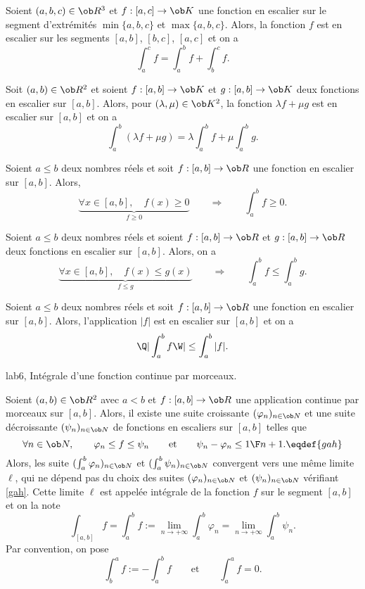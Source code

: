 \Propriete [Title=Relation de Chasles]
Soient $(a,b,c)\in\ob R^3$ et $f:[a,c]\to\ob K$ une fonction en escalier sur le segment d'extrémités $\min\{a,b,c\}$ et $\max\{a,b,c\}$. Alors, la fonction $f$ est en escalier sur les segments $[a,b]$, $[b,c]$, $[a,c]$ et on a 
$$
\int_a^cf=\int_a^bf+\int_b^cf. 
$$

\Propriete [Title=Linéarité de l'intégrale]
Soit $(a,b)\in\ob R^2$ et soient $f:[a,b]\to\ob K$ et $g:[a,b]\to\ob K$ deux fonctions en escalier sur $[a,b]$. Alors, pour $(\lambda,\mu)\in\ob K^2$, la fonction $\lambda f+\mu g$ est en escalier sur $[a,b]$ et on a 
$$
\int_a^b(\lambda f+\mu g)=\lambda \int_a^bf+\mu \int_a^bg. 
$$

\Propriete[Title=positivité de l'intégrale] Soient $a\le b$ deux nombres réels et soit $f:[a,b]\to\ob R$ une fonction en escalier sur $[a,b]$. Alors, 
$$
\underbrace{
\forall x\in[a,b],\quad f(x)\ge0}_{f\ge0}\qquad\Longrightarrow\qquad \int_a^bf\ge0.
$$ 
\bigskip


\Propriete [Title=Croissance de l'intégrale]
Soient $a\le b$ deux nombres réels et soient $f:[a,b]\to\ob R$ et $g:[a,b]\to\ob R$ deux fonctions en escalier sur $[a,b]$. Alors, on a 
$$
\underbrace{
\forall x\in[a,b],\quad f(x)\le g(x)}_{f\le g}\qquad\Longrightarrow\qquad \int_a^bf\le \int_a^bg.
$$ 

\Propriete[Title=module]
Soient $a\le b$ deux nombres réels et soit $f:[a,b]\to\ob R$ une fonction 
en escalier sur $[a,b]$. Alors, l'application $|f|$ est en escalier sur $[a,b]$ et on a 
$$
\Q|\int_a^bf\W|\le \int_a^b|f|.
$$ 
\bigskip

\Subsection lab6, Intégrale d'une fonction continue par morceaux. 

\Definition []  Soient $(a,b)\in\ob R^2$ avec $a< b$ et $f:[a,b]\to\ob R$ une application continue par morceaux sur $[a,b]$. 
Alors, il existe une suite croissante $(\varphi_n)_{n\in\ob N}$ et une suite décroissante $(\psi_n)_{n\in\ob N}$ de fonctions en escaliers sur $[a,b]$ telles que 
$$
\forall n\in\ob N, \qquad \varphi_n\le f\le \psi_n\qquad\mbox{et}\qquad \psi_n-\varphi_n\le {1\F n+1}.\eqdef{gah}
$$
Alors, les suite $(\int_a^b\varphi_n)_{n\in\ob N}$ et $(\int_a^b\psi_n)_{n\in\ob N}$ convergent vers une même limite $\ell$, qui ne dépend pas du choix des suites $(\varphi_n)_{n\in\ob N}$ et $(\psi_n)_{n\in\ob N}$ vérifiant \eqref{gah}. 
Cette limite $\ell$ est appelée intégrale de la fonction $f$ sur le segment $[a,b]$ et on la note
$$
\int_{[a,b]}f= \int_a^bf:=\lim_{n\to+\infty}\int_a^b\varphi_n=\lim_{n\to+\infty}\int_a^b\psi_n.
$$
Par convention, on pose 
$$
\int_b^af:=-\int_a^bf\qquad \mbox{et}\qquad \int_a^af=0.
$$

